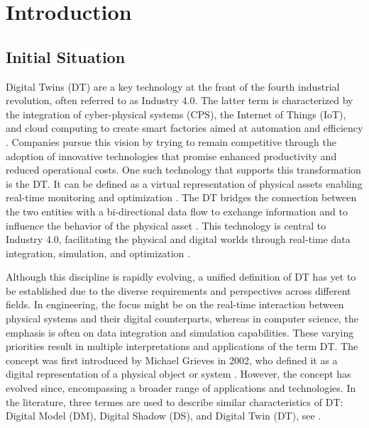 \chapter{Introduction}
\label{chap:introduction}

\section{Initial Situation}
Digital Twins (DT) are a key technology at the front of the fourth industrial revolution, often referred to as Industry 4.0.
The latter term is characterized by the integration of cyber-physical systems (CPS), the Internet of Things (IoT), and cloud computing to create smart factories aimed at automation and efficiency \autocite{Oztemel2020}. Companies pursue this vision by trying to remain competitive through the adoption of innovative technologies that promise enhanced productivity and reduced operational costs. One such technology that supports this transformation is the DT. It can be defined as a virtual representation of physical assets enabling real-time monitoring and optimization \autocite{Tao2018ijamt}. The DT bridges the connection between the two entities with a bi-directional data flow to exchange information and to influence the behavior of the physical asset \autocite{grieves2014digital}. This technology is central to Industry 4.0, facilitating the physical and digital worlds through real-time data integration, simulation, and optimization \autocite{judijanto2024trends}.

Although this discipline is rapidly evolving, a unified definition of DT has yet to be established due to the diverse requirements and perspectives across different fields. In engineering, the focus might be on the real-time interaction between physical systems and their digital counterparts, whereas in computer science, the emphasis is often on data integration and simulation capabilities. These varying priorities result in multiple interpretations and applications of the term DT. The concept was first introduced by Michael Grieves in 2002, who defined it as a digital representation of a physical object or system \autocite{grieves2014digital}. However, the concept has evolved since, encompassing a broader range of applications and technologies. In the literature, three termes are used to describe similar characteristics of DT: Digital Model (DM), Digital Shadow (DS), and Digital Twin (DT), see  \autocite{jones2020characterising,Zhang2021jmsy}.

